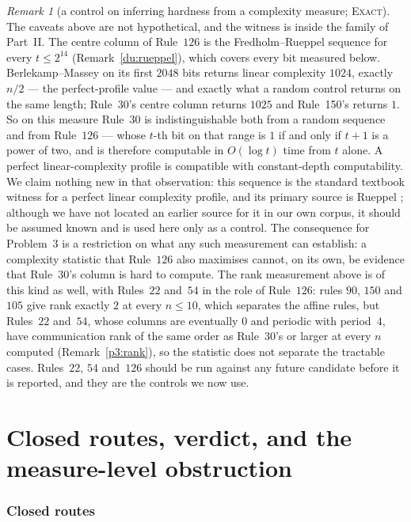 \documentclass[11pt]{article}
\theoremstyle{definition}
\theoremstyle{remark}
\newtheorem{remark}[theorem]{Remark}
\newcommand{\EXACT}{\textsc{Exact}}
\begin{document}
\begin{remark}[a control on inferring hardness from a complexity measure; \EXACT]\label{p3:rueppel}
The caveats above are not hypothetical, and the witness is inside the family of Part~II. The centre
column of Rule~$126$ is the Fredholm--Rueppel sequence for every $t\le2^{14}$ (Remark~\ref{du:rueppel}), which covers every bit measured below. Berlekamp--Massey on
its first $2048$ bits returns linear complexity $1024$, exactly $n/2$ --- the perfect-profile value --- and exactly what a random
control returns on the same length; Rule~30's centre column returns $1025$ and Rule~150's returns $1$.
So on this measure Rule~30 is indistinguishable both from a random sequence and from Rule~$126$ ---
whose $t$-th bit on that range is $1$ if and only if $t+1$ is a power of two, and is therefore computable in
$O(\log t)$ time from $t$ alone. A perfect linear-complexity profile is compatible with constant-depth
computability. We claim nothing new in that observation: this sequence is the standard textbook
witness for a perfect linear complexity profile, and its primary source is Rueppel \cite{Rueppel}; although we have not located an earlier source for
it in our own corpus, it should be assumed known and is used here only as a control. The consequence for Problem~3 is a restriction on
what any such measurement can establish: a complexity statistic that Rule~$126$ also maximises cannot,
on its own, be evidence that Rule~30's column is hard to compute. The rank measurement above is of
this kind as well, with Rules~$22$ and~$54$ in the role of Rule~$126$: rules $90$, $150$ and $105$ give rank exactly $2$ at every $n\le10$, which separates the affine rules, but Rules~$22$ and~$54$, whose columns are eventually $0$ and periodic with period~$4$, have communication rank of the same order as Rule~30's or larger at every $n$ computed (Remark~\ref{p3:rank}), so the statistic does not separate the
tractable cases. Rules~$22$, $54$ and~$126$ should be run against any future candidate before it is
reported, and they are the controls we now use.
\end{remark}

\part{Closed routes, verdict, and the measure-level obstruction}

\section{Closed routes}\label{sec:closed}
\end{document}
